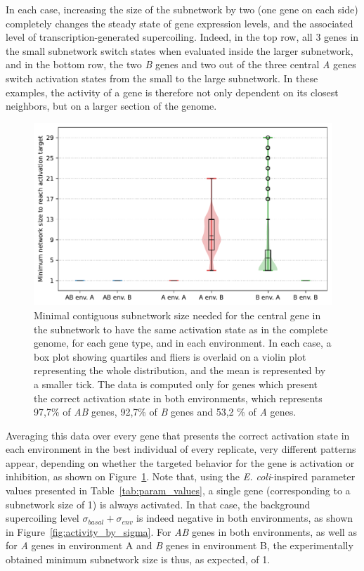 In each case, increasing the size of the subnetwork by two (one gene on each side) completely changes the steady state of gene expression levels, and the associated level of transcription-generated supercoiling.
Indeed, in the top row, all 3 genes in the small subnetwork switch states when evaluated inside the larger subnetwork, and in the bottom row, the two \emph{B} genes and two out of the three central \emph{A} genes switch activation states from the small to the large subnetwork.
In these examples, the activity of a gene is therefore not only dependent on its closest neighbors, but on a larger section of the genome.

\begin{figure}[H]
  \centering
  \includegraphics[width=\textwidth]{ploscb/img/min_network_size.pdf}
  \caption{Minimal contiguous subnetwork size needed for the central gene in the subnetwork to have the same activation state as in the complete genome, for each gene type, and in each environment.
  In each case, a box plot showing quartiles and fliers is overlaid on a violin plot representing the whole distribution, and the mean is represented by a smaller tick.
  The data is computed only for genes which present the correct activation state in both environments, which represents 97,7\% of \emph{AB} genes, 92,7\% of \emph{B} genes and 53,2 \% of \emph{A} genes.}
  \label{fig:min_subnetwork}
\end{figure}

Averaging this data over every gene that presents the correct activation state in each environment in the best individual of every replicate, very different patterns appear, depending on whether the targeted behavior for the gene is activation or inhibition, as shown on Figure~\ref{fig:min_subnetwork}.
Note that, using the \emph{E. coli}-inspired parameter values presented in Table~\ref{tab:param_values}, a single gene (corresponding to a subnetwork size of 1) is always activated.
In that case, the background supercoiling level $\sigma_{basal} + \sigma_{env}$ is indeed negative in both environments, as shown in Figure~\ref{fig:activity_by_sigma}.
For \emph{AB} genes in both environments, as well as for \emph{A} genes in environment A and \emph{B} genes in environment B, the experimentally obtained minimum subnetwork size is thus, as expected, of 1.

